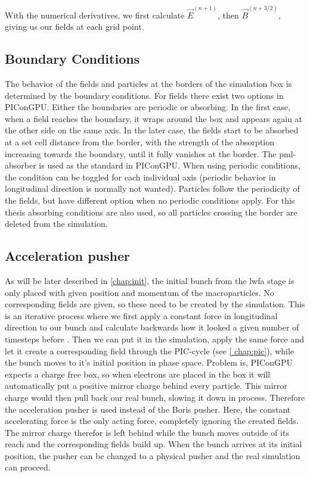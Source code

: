 \documentclass[bachelor_thesis]{subfiles}
\begin{document}

With the numerical derivatives, we first calculate $\vec{E}^{(n+1)}$, then $\vec{B}^{(n+3/2)}$, giving us our fields at each grid point.

\subsection{Boundary Conditions}
The behavior of the fields and particles at the borders of the simulation box is determined by the boundary conditions.
For fields there exist two options in PIConGPU. Either the boundaries are periodic or absorbing. In the first case, when a field reaches the boundary, it wraps around the box and appears again at the other side on the same axis.
In the later case, the fields start to be absorbed at a set cell distance from the border, with the strength of the absorption increasing towards the boundary, until it fully vanishes at the border.
The \gls{pml}-absorber is used as the standard in PIConGPU. When using periodic conditions, the condition can be toggled for each individual axis (periodic behavior in longitudinal direction is normally not wanted).
Particles follow the periodicity of the fields, but have different option when no periodic conditions apply. For this thesis absorbing conditions are also used, so all particles crossing the border are deleted from the simulation.

\subsection{Acceleration pusher} \label{chap:accpush}
As will be later described in \autoref{chap:init}, the initial bunch from the \gls{lwfa} stage is only placed with given position and momentum of the macroparticles.
No corresponding fields are given, so these need to be created by the simulation. This is an iterative process where we first apply a constant force in longitudinal direction to our bunch and calculate backwards how it looked a given number of timesteps before \cite{Huebl2014}.
Then we can put it in the simulation, apply the same force and let it create a corresponding field through the PIC-cycle (see \autoref{	chap:pic}), while the bunch moves to it's initial position in phase space. 
Problem is, PIConGPU expects a charge free box, so when electrons are placed in the box it will automatically put a positive mirror charge behind every particle. This mirror charge would then pull back our real 
bunch, slowing it down in process. Therefore the acceleration pusher is used instead of the Boris pusher. Here, the constant accelerating force is the only acting force, completely ignoring the created fields.
The mirror charge therefor is left behind while the bunch moves outside of its reach and the corresponding fields build up. When the bunch arrives at its initial position, the pusher can be changed to a physical pusher and
the real simulation can proceed.
\end{document}
